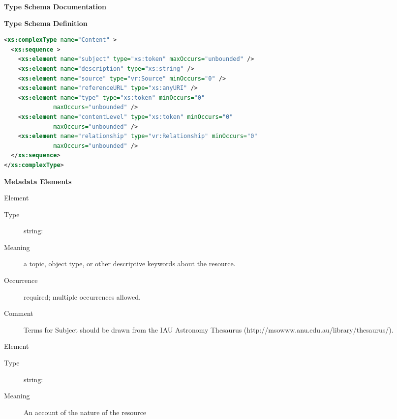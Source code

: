 \documentclass[11pt,a4paper]{ivoa}
\begin{document}
\begin{generated}
\begingroup
      	\renewcommand*\descriptionlabel[1]{%
      	\hbox to 5.5em{\emph{#1}\hfil}}\vspace{2ex}\noindent\textbf{ Type Schema Documentation}


\vspace{1ex}\noindent\textbf{ Type Schema Definition}

\begin{lstlisting}[language=XML,basicstyle=\footnotesize]
<xs:complexType name="Content" >
  <xs:sequence >
    <xs:element name="subject" type="xs:token" maxOccurs="unbounded" />
    <xs:element name="description" type="xs:string" />
    <xs:element name="source" type="vr:Source" minOccurs="0" />
    <xs:element name="referenceURL" type="xs:anyURI" />
    <xs:element name="type" type="xs:token" minOccurs="0"
              maxOccurs="unbounded" />
    <xs:element name="contentLevel" type="xs:token" minOccurs="0"
              maxOccurs="unbounded" />
    <xs:element name="relationship" type="vr:Relationship" minOccurs="0"
              maxOccurs="unbounded" />
  </xs:sequence>
</xs:complexType>
\end{lstlisting}

\vspace{0.5ex}\noindent\textbf{ Metadata Elements}

\begingroup\small\begin{bigdescription}\item[Element \xmlel{subject}]
\begin{description}
\item[Type] string: 
\item[Meaning] 
               a topic, object type, or other descriptive keywords 
               about the resource.  
             
\item[Occurrence] required; multiple occurrences allowed.
\item[Comment] 
               Terms for Subject should be drawn from the IAU Astronomy 
               Thesaurus (http://msowww.anu.edu.au/library/thesaurus/).
             

\end{description}
\item[Element \xmlel{description}]
\begin{description}
\item[Type] string: 
\item[Meaning] 
               An account of the nature of the resource
             

\end{description}
\end{bigdescription}
\end{generated}
\end{document}
